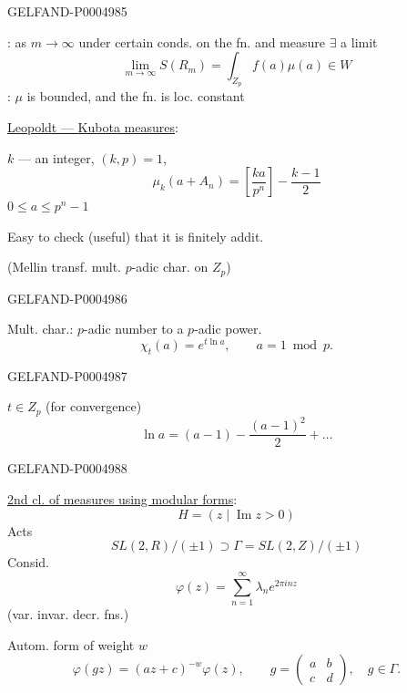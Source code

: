 \begin{GelfandAdjacentEvidence}{GELFAND-P000498}{5}


: as $m\to\infty$ under certain conds. on the fn. and measure $\exists$ a limit
\[
\lim_{m\to\infty}S(R_m)=\int_{Z_p}f(a)\mu(a)\in W
\]
: $\mu$ is bounded, and the fn. is loc. constant

\uline{Leopoldt — Kubota measures}:

$k$ — an integer, $(k,p)=1$,
\[
\mu_k(a+A_n)=\left[\frac{ka}{p^n}\right]-\frac{k-1}{2}
\]
$0\le a\le p^n-1$

Easy to check (useful) that it is finitely addit.

(Mellin transf.
mult. $p$-adic char. on $Z_p$)
\end{GelfandAdjacentEvidence}
\begin{GelfandAdjacentEvidence}{GELFAND-P000498}{6}

Mult. char.: $p$-adic number to a $p$-adic power.
\[
\chi_t(a)=e^{t\ln a},\qquad a=1\bmod p.
\]
\end{GelfandAdjacentEvidence}
\begin{GelfandAdjacentEvidence}{GELFAND-P000498}{7}

\underline{$t\in Z_p$} (for convergence)
\[
\ln a=(a-1)-\frac{(a-1)^2}{2}+\ldots
\]
\end{GelfandAdjacentEvidence}
\begin{GelfandAdjacentEvidence}{GELFAND-P000498}{8}


\uline{2nd cl. of measures using modular forms}:
\[
H=(z\mid\operatorname{Im}z>0)
\]
Acts
\[
SL(2,R)/(\pm1)\supset\Gamma=SL(2,Z)/(\pm1)
\]
Consid.
\[
\varphi(z)=\sum_{n=1}^{\infty}\lambda_n e^{2\pi inz}
\]
(var. invar. decr. fns.)

Autom. form of weight $w$
\[
\varphi(gz)=(az+c)^{-w}\varphi(z),\qquad
g=\begin{pmatrix}a&b\\c&d\end{pmatrix},\quad g\in\Gamma.
\]
\end{GelfandAdjacentEvidence}



